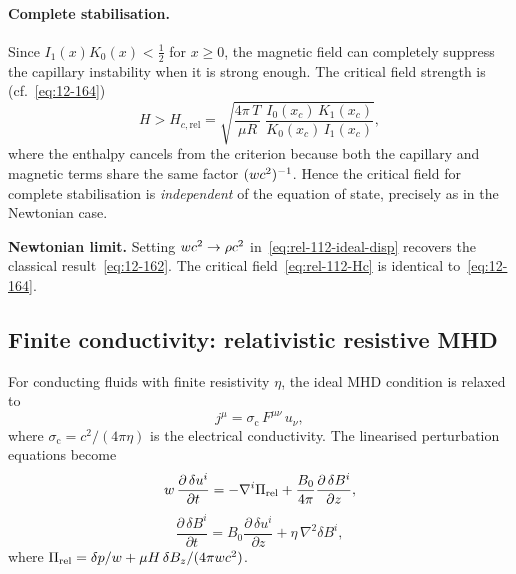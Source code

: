 \paragraph{Complete stabilisation.}
Since $I_{1}(x)K_{0}(x) < \frac{1}{2}$ for $x \geq 0$, the
magnetic field can completely suppress the capillary instability
when it is strong enough.  The critical field strength is
(cf.~\eqref{eq:12-164})
\begin{equation}
\label{eq:rel-112-Hc}
H > H_{c,\mathrm{rel}}
  = \sqrt{\frac{4\pi\,T}{\mu R}\;
  \frac{I_{0}(x_{c})\,K_{1}(x_{c})}
  {K_{0}(x_{c})\,I_{1}(x_{c})}},
\end{equation}
where the enthalpy cancels from the criterion because both
the capillary and magnetic terms share the same factor
$(w c^{2})^{-1}$.  Hence the critical field for complete
stabilisation is \emph{independent} of the equation of state,
precisely as in the Newtonian case.

\begin{relcorrection}
\textbf{Newtonian limit.}
Setting $w c^{2} \to \rho c^{2}$ in~\eqref{eq:rel-112-ideal-disp}
recovers the classical result~\eqref{eq:12-162}.  The critical
field~\eqref{eq:rel-112-Hc} is identical to~\eqref{eq:12-164}.
\end{relcorrection}

\subsection{Finite conductivity: relativistic resistive MHD}
\label{sec:rel-112-resistive}

For conducting fluids with finite resistivity $\eta$, the ideal
MHD condition is relaxed to
\begin{equation}
\label{eq:rel-112-ohm}
j^{\mu} = \sigma_{\mathrm{c}}\,F^{\mu\nu}\,u_{\nu},
\end{equation}
where $\sigma_{\mathrm{c}} = c^{2}/(4\pi\eta)$ is the electrical
conductivity.  The linearised perturbation equations become
\begin{equation}
\label{eq:rel-112-res-momentum}
w\,\frac{\partial\,\delta u^{i}}{\partial t}
  = -\nabla^{i}\Pi_{\mathrm{rel}}
  + \frac{B_{0}}{4\pi}\frac{\partial\,\delta B^{i}}{\partial z},
\end{equation}
\begin{equation}
\label{eq:rel-112-res-induction}
\frac{\partial\,\delta B^{i}}{\partial t}
  = B_{0}\frac{\partial\,\delta u^{i}}{\partial z}
  + \eta\,\nabla^{2}\delta B^{i},
\end{equation}
where
$\Pi_{\mathrm{rel}} = \delta p/w
+ \mu H\,\delta B_{z}/(4\pi w c^{2})$.

